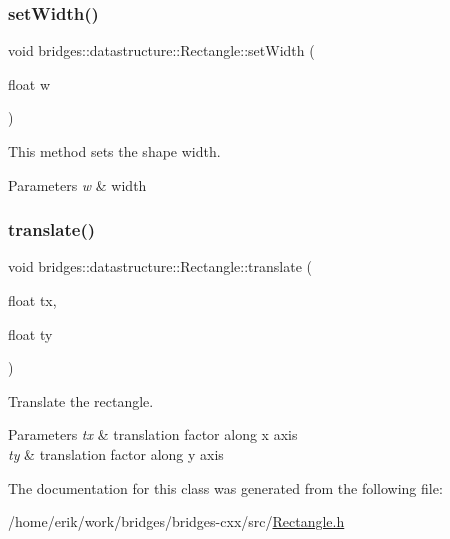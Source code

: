\mbox{\label{classbridges_1_1datastructure_1_1_rectangle_a7f6182e74816a6c7cf83ae49d5ed55be}} 
\subsubsection{\texorpdfstring{set\+Width()}{setWidth()}}
{\footnotesize\ttfamily void bridges\+::datastructure\+::\+Rectangle\+::set\+Width (\begin{DoxyParamCaption}\item[{float}]{w }\end{DoxyParamCaption})\hspace{0.3cm}{\ttfamily [inline]}}



This method sets the shape width. 


\begin{DoxyParams}{Parameters}
{\em w} & width \\
\hline
\end{DoxyParams}
\mbox{\label{classbridges_1_1datastructure_1_1_rectangle_a910c2a92c38e2e13bde3f1fd51b17316}} 
\subsubsection{\texorpdfstring{translate()}{translate()}}
{\footnotesize\ttfamily void bridges\+::datastructure\+::\+Rectangle\+::translate (\begin{DoxyParamCaption}\item[{float}]{tx,  }\item[{float}]{ty }\end{DoxyParamCaption})\hspace{0.3cm}{\ttfamily [inline]}}



Translate the rectangle. 


\begin{DoxyParams}{Parameters}
{\em tx} & translation factor along x axis \\
\hline
{\em ty} & translation factor along y axis \\
\hline
\end{DoxyParams}


The documentation for this class was generated from the following file\+:\begin{DoxyCompactItemize}
\item 
/home/erik/work/bridges/bridges-\/cxx/src/\hyperlink{_rectangle_8h}{Rectangle.\+h}\end{DoxyCompactItemize}
